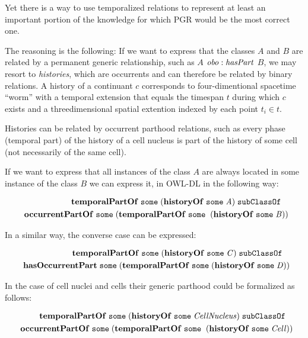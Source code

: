 Yet there is a way to use temporalized relations to represent at least an important portion of the knowledge for which PGR would be the most correct one.

The reasoning is the following: If we want to express that the classes $A$ and $B$ are related by a permanent generic relationship, such as $A$ $\mathit{obo:hasPart}$ $B$, we may resort to \emph{histories}, which are occurrents and can therefore be related by binary relations. A history of a continuant $c$ corresponds to four-dimentional spacetime ``worm'' with a temporal extension that equals the timespan $t$ during which $c$ exists and a threedimensional spatial extention indexed by each point $t_i \in t$.


Histories can be related by occurrent parthood relations, such as every phase (temporal part) of the history of a cell nucleus is part of the history of some cell (not necessarily of the same cell).  


If we want to express that all instances of the class $A$ are always located in some instance of the class $B$ we can express it, in OWL-DL in the following way:


\begin{equation}
\begin{split}
\mathrm{\mathbf{temporalPartOf}}\;\mathtt{some}\;(\mathrm{\mathbf{historyOf}}\;\mathtt{some}\;\mathit{A}) \;\mathtt{subClassOf}\ \; \; \\
\; \; \mathrm{\mathbf{occurrentPartOf}}\;\mathtt{some}\;(\mathrm{\mathbf{temporalPartOf}}\;\mathtt{some}\;
\;(\mathrm{\mathbf{historyOf}}\;\mathtt{some}\;\mathit{B}))
\end{split}
\label{eq:history:PartOf}
\end{equation}    

In a similar way, the converse case can be expressed:

\begin{equation}
\begin{split}
\mathrm{\mathbf{temporalPartOf}}\;\mathtt{some}\;(\mathrm{\mathbf{historyOf}}\;\mathtt{some}\;\mathit{C}) \;\mathtt{subClassOf}\ \; \; \\
\; \; \mathrm{\mathbf{hasOccurrentPart}}\;\mathtt{some}\;(\mathrm{\mathbf{temporalPartOf}}\;\mathtt{some}\;
(\mathrm{\mathbf{historyOf}}\;\mathtt{some}\;\mathit{D}))
\end{split}
\label{eq:history:hasPart}
\end{equation}    

In the case of cell nuclei and cells their generic parthood could be formalized as follows:

\begin{equation}
\begin{split}
\mathrm{\mathbf{temporalPartOf}}\;\mathtt{some}\;(\mathrm{\mathbf{historyOf}}\;\mathtt{some}\;\mathit{CellNucleus}) \;\mathtt{subClassOf}\ \; \; \\
\; \; \mathrm{\mathbf{occurrentPartOf}}\;\mathtt{some}\;(\mathrm{\mathbf{temporalPartOf}}\;\mathtt{some}\;
\;(\mathrm{\mathbf{historyOf}}\;\mathtt{some}\;\mathit{Cell}))
\end{split}
\label{eq:historyCell}
\end{equation}    

